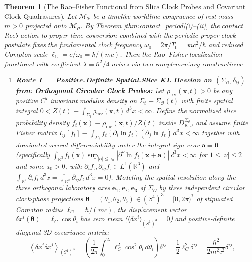 \documentclass[11pt, a4paper]{article}
\newtheorem{theorem}{Theorem}[section]
\theoremstyle{definition}
\begin{document}
\begin{theorem}[The Rao--Fisher Functional from Slice Clock Probes and Covariant Clock Quadratures]
\label{thm:clock_sideband}
Let $\mathcal{M}_{\mathcal{P}}$ be a timelike worldline congruence of rest mass $m > 0$ projected onto $\mathcal{M}_{\mathcal{O}}$. By Theorem \ref{thm:contact_period}(i)--(ii), the contact Reeb action-to-proper-time conversion combined with the periodic proper-clock postulate fixes the fundamental clock frequency $\omega_0 = 2\pi/T_0 = mc^2/\hbar$ and reduced Compton scale $\ell_C = c/\omega_0 = \hbar/(mc)$. Then the Rao--Fisher localization functional with coefficient $\lambda = \hbar^2/4$ arises via two complementary constructions:
\begin{enumerate}[label=(\roman*)]
    \item \textbf{Route I --- Positive-Definite Spatial-Slice KL Hessian on $(\Sigma_{\mathcal{O}}, \delta_{ij})$ from Orthogonal Circular Clock Probes:} Let $\rho_{\text{inv}}(\mathbf{x}, t) > 0$ be any positive $C^2$ invariant modulus density on $\Sigma_t \equiv \Sigma_{\mathcal{O}}(t)$ with finite spatial integral $0 < Z(t) \equiv \int_{\Sigma_t} \rho_{\text{inv}}(\mathbf{x}, t)\,d^3x < \infty$. Define the normalized slice probability density $f_t(\mathbf{x}) \equiv \rho_{\text{inv}}(\mathbf{x}, t) / Z(t)$ inside $D_{\text{KL}}^{\Sigma_{\mathcal{O}}}$, and assume finite Fisher matrix $I_{ij}[f_t] \equiv \int_{\Sigma_t} f_t(\partial_i\ln f_t)(\partial_j\ln f_t)\,d^3x < \infty$ together with dominated second differentiability under the integral sign near $\mathbf{a} = \mathbf{0}$ (specifically $\int_{\mathbb{R}^3} f_t(\mathbf{x})\sup_{|\mathbf{a}|\le a_0}|\partial^\nu\ln f_t(\mathbf{x}+\mathbf{a})|\,d^3x < \infty$ for $1 \le |\nu| \le 2$ and some $a_0 > 0$, with $\partial_i f_t, \partial_{ij}f_t \in L^1(\mathbb{R}^3)$ and $\int_{\mathbb{R}^3}\partial_i f_t\,d^3x = \int_{\mathbb{R}^3}\partial_{ij}f_t\,d^3x = 0$). Modeling the spatial resolution along the three orthogonal laboratory axes $\mathbf{e}_1, \mathbf{e}_2, \mathbf{e}_3$ of $\Sigma_{\mathcal{O}}$ by three independent circular clock-phase projections $\boldsymbol{\theta} = (\theta_1, \theta_2, \theta_3) \in (S^1)^3 = [0, 2\pi)^3$ of stipulated Compton radius $\ell_C = \hbar/(mc)$, the displacement vector $\delta x^i(\boldsymbol{\theta}) = \ell_C \cos\theta_i$ has zero mean ($\langle \delta x^i \rangle_{(S^1)^3} = 0$) and positive-definite diagonal 3D covariance matrix:
    \begin{equation}
    \label{eq:s1_circle_variance}
    \left\langle \delta x^i \delta x^j \right\rangle_{(S^1)^3} = \left( \frac{1}{2\pi}\int_0^{2\pi} \ell_C^2 \cos^2\theta_i \, d\theta_i \right) \delta^{ij} = \frac{1}{2}\ell_C^2 \delta^{ij} = \frac{\hbar^2}{2m^2 c^2}\delta^{ij},

\end{equation}
\end{enumerate}
\end{theorem}
\end{document}
